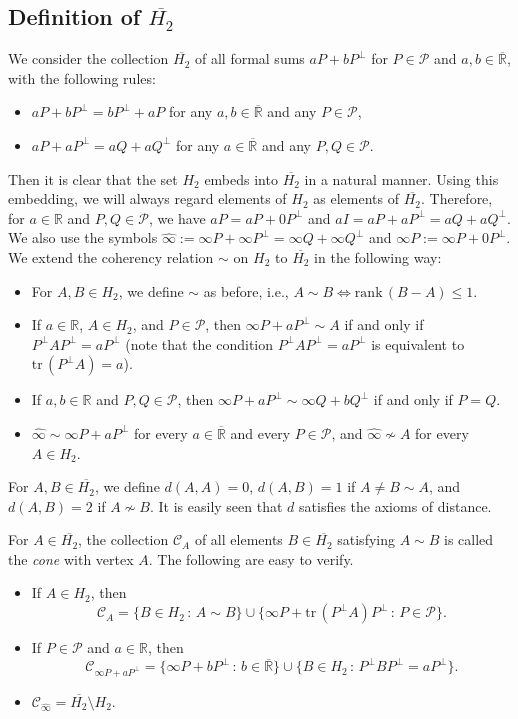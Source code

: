 \documentclass[10pt,a4paper]{amsart}
\providecommand{\index}[1]{}
\newcommand\cC{{\mathcal{C}}}
\newcommand\cP{{\mathcal{P}}}
\newcommand\bR{{\mathbb{R}}}
\newcommand\oH{{\overline{H_2}}}
\newcommand\oi{{\widehat{\infty}}}
\newcommand\oR{{\overline{\mathbb{R}}}}
\theoremstyle{definition}
\theoremstyle{remark}
\numberwithin{subsection}{section}
\numberwithin{equation}{section}
\begin{document}
\subsection{Definition of $\oH$}
We consider the collection $\oH$ \index{$H$@$\oH$} of all formal sums $aP+bP^{\perp}$ for $P\in \cP$ and $a, b\in \oR$, with the following rules:
\begin{itemize}
\item  $aP+bP^\perp=bP^\perp+aP$ for any $a, b\in {\oR}$ and any $P\in \cP$,  
\item $a P+a P^{\perp}=a Q+a Q^{\perp}$ for any $a\in {\oR}$ and any $P, Q\in \cP$. 
\end{itemize}
Then it is clear that the set $H_2$ embeds into $\oH$ in a natural manner.
Using this embedding, we will always regard elements of $H_2$ as elements of $\oH$.
Therefore, for $a\in \mathbb{R}$ and $P, Q\in \cP$, we have $a P = a P +0P^\perp$ and $aI =aP+aP^\perp =aQ+aQ^\perp$.
We also use the symbols ${\oi}:=\infty P+\infty P^{\perp}=\infty Q+\infty Q^{\perp}$\index{$\infty$2@$\oi$} and $\infty P := \infty P +0P^\perp$\index{$Pinfty$@$\infty P$}.
We extend the coherency relation $\sim$ on $H_2$ to $\oH$ in the following way\index{$\sim$2@$\sim$ (on $\oH$)}: 
\begin{itemize}
\item For $A, B\in H_2$, we define $\sim$ as before, i.e., $A\sim B \iff \mathrm{rank}\, (B - A ) \le 1$. 
\item If $a\in \bR$, $A\in H_2$, and $P\in\cP$, then $\infty P+a P^{\perp}\sim A$ if and only if $P^{\perp} AP^{\perp}=aP^{\perp}$ (note that the condition $P^{\perp} AP^{\perp}=aP^{\perp}$ is equivalent to $\mathrm{tr}\, (P^\perp A) = a$).
\item If $a, b\in \bR$ and $P, Q\in \cP$, then $\infty P+a P^{\perp}\sim \infty Q + bQ^{\perp}$ if and only if $P=Q$. 
\item ${\oi} \sim \infty P+aP^{\perp}$ for every $a\in {\oR}$ and every $P\in \cP$, and ${\oi} \not\sim A$ for every $A\in H_2$.
\end{itemize}
For $A, B\in \oH$, we define $d(A, A)=0$, $d(A, B)=1$ if $A\neq B\sim A$, and $d(A, B)=2$ if $A\not\sim B$\index{$d$}. It is easily seen that $d$ satisfies the axioms of distance. 

For $A\in \oH$, the collection $\cC_A$ \index{$C(A)$@$\cC_A$} of all elements $B\in \oH$ satisfying $A\sim B$ is called the \emph{cone} \index{cone} with vertex $A$. The following are easy to verify.
\begin{itemize}
\item If $A\in H_2$, then 
\[
\cC_A=\{B\in H_2\,:\, A\sim B\} \cup \{\infty P+\mathrm{tr}\, (P^\perp A) P^\perp\,:\, P\in \cP\}.
\]
\item If $P\in \cP$ and $a\in \bR$, then 
\[
\cC_{\infty P+ aP^{\perp}}=\{\infty P+ bP^{\perp}\,:\, b\in {\oR}\} \cup \{B\in H_2\,:\, P^{\perp}BP^{\perp}=aP^\perp\}.
\] 
\item $\cC_{\oi} =\oH\setminus H_2$.
\end{itemize}
\end{document}
